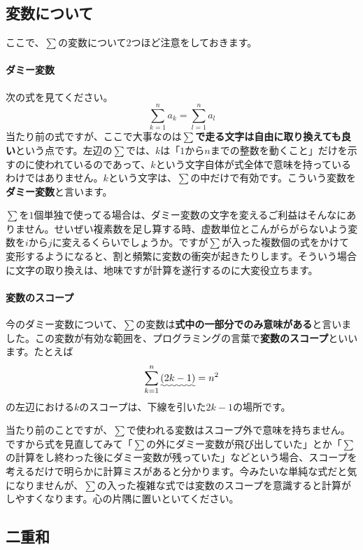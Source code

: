\subsection{変数について}

ここで、$\sum$の変数について$2$つほど注意をしておきます。

\paragraph{ダミー変数}

次の式を見てください。
\[
\sum_{k = 1}^n a_k = \sum_{l = 1}^n a_l
\]
当たり前の式ですが、ここで大事なのは\textbf{$\sum$で走る文字は自由に取り換えても良い}という点です。左辺の$\sum$では、$k$は「$1$から$n$までの整数を動くこと」だけを示すのに使われているのであって、$k$という文字自体が式全体で意味を持っているわけではありません。$k$という文字は、$\sum$の中だけで有効です。こういう変数を\textbf{ダミー変数}と言います。

$\sum$を$1$個単独で使ってる場合は、ダミー変数の文字を変えるご利益はそんなにありません。せいぜい複素数を足し算する時、虚数単位とこんがらがらないよう変数を$i$から$j$に変えるくらいでしょうか。ですが$\sum$が入った複数個の式をかけて変形するようになると、割と頻繁に変数の衝突が起きたりします。そういう場合に文字の取り換えは、地味ですが計算を遂行するのに大変役立ちます。

\paragraph{変数のスコープ}

今のダミー変数について、$\sum$の変数は\textbf{式中の一部分でのみ意味がある}と言いました。この変数が有効な範囲を、プログラミングの言葉で\textbf{変数のスコープ}といいます。たとえば
\[
\sum_{k=1}^n \uwave{(2k - 1)} = n^2
\]
の左辺における$k$のスコープは、下線を引いた$2k-1$の場所です。

当たり前のことですが、$\sum$で使われる変数はスコープ外で意味を持ちません。ですから式を見直してみて「$\sum$の外にダミー変数が飛び出していた」とか「$\sum$の計算をし終わった後にダミー変数が残っていた」などという場合、スコープを考えるだけで明らかに計算ミスがあると分かります。今みたいな単純な式だと気になりませんが、$\sum$の入った複雑な式では変数のスコープを意識すると計算がしやすくなります。心の片隅に置いといてください。

\subsection{二重和}

